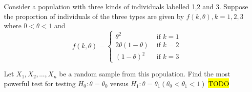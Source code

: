 \begin{example}
\label{exa:isi2008samplepsb10}Consider a population with three kinds
of individuals labelled 1,2 and 3. Suppose the proportion of individuals
of the three types are given by $f(k,\theta),k=1,2,3$ where $0<\theta<1$
and 
\[
f(k,\theta)=\begin{cases}
\theta^{2} & \text{ if }k=1\\
2\theta(1-\theta) & \text{ if }k=2\\
(1-\theta)^{2} & \text{ if }k=3
\end{cases}
\]

Let $X_{1},X_{2},\ldots,X_{n}$ be a random sample from this population.
Find the most powerful test for testing $H_{0}:\theta=\theta_{0}$
versus $H_{1}:\theta=\theta_{1}\left(\theta_{0}<\theta_{1}<1\right)$
\hl{TODO}
\end{example}



